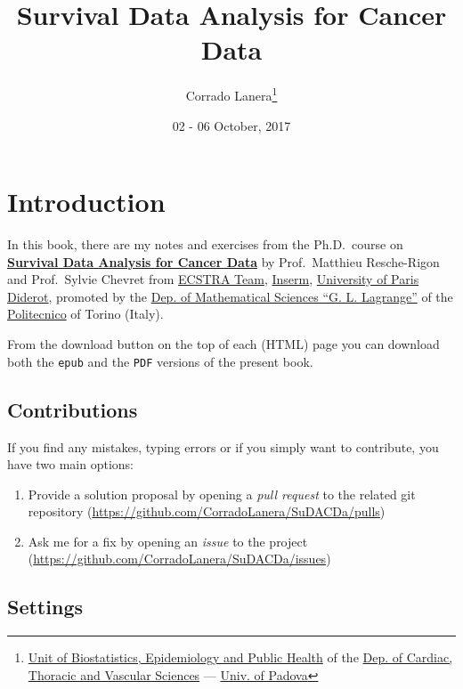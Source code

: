 \documentclass[]{book}
\title{Survival Data Analysis for Cancer Data}
\author{Corrado Lanera\footnote{\href{http://www.dctv.unipd.it/dipartimento/strutture/biostatistica}{Unit
  of Biostatistics, Epidemiology and Public Health} of the
  \href{http://www.dctv.unipd.it/}{Dep. of Cardiac, Thoracic and
  Vascular Sciences} --- \href{http://www.unipd.it/}{Univ. of Padova}}}
\date{02 - 06 October, 2017}
\providecommand{\tightlist}{%
  \setlength{\itemsep}{0pt}\setlength{\parskip}{0pt}}
\theoremstyle{definition}
\theoremstyle{definition}
\theoremstyle{definition}
\theoremstyle{remark}
\begin{document}
\maketitle

{
\setcounter{tocdepth}{1}
\tableofcontents
}
\chapter*{Introduction}\label{introduction}

In this book, there are my notes and exercises from the Ph.D.~course on
\href{http://www.politocomunica.polito.it/events/appuntamenti/(idnews)/9665}{\textbf{Survival
Data Analysis for Cancer Data}} by Prof.~Matthieu Resche-Rigon and
Prof.~Sylvie Chevret from \href{http://www.cress-umr1153.fr/}{ECSTRA
Team}, \href{https://www.inserm.fr/}{Inserm},
\href{https://www.univ-paris-diderot.fr/}{University of Paris Diderot},
promoted by the \href{http://www.disma.polito.it/}{Dep. of Mathematical
Sciences ``G. L. Lagrange''} of the
\href{http://www.polito.it/}{Politecnico} of Torino (Italy).

From the download button on the top of each (HTML) page you can download
both the \texttt{epub} and the \texttt{PDF} versions of the present
book.

\section*{Contributions}\label{contributions}

If you find any mistakes, typing errors or if you simply want to
contribute, you have two main options:

\begin{enumerate}
\def\labelenumi{\arabic{enumi}.}
\tightlist
\item
  Provide a solution proposal by opening a \emph{pull request} to the
  related git repository
  (\url{https://github.com/CorradoLanera/SuDACDa/pulls})
\item
  Ask me for a fix by opening an \emph{issue} to the project
  (\url{https://github.com/CorradoLanera/SuDACDa/issues})
\end{enumerate}

\section*{Settings}\label{settings}
\end{document}
